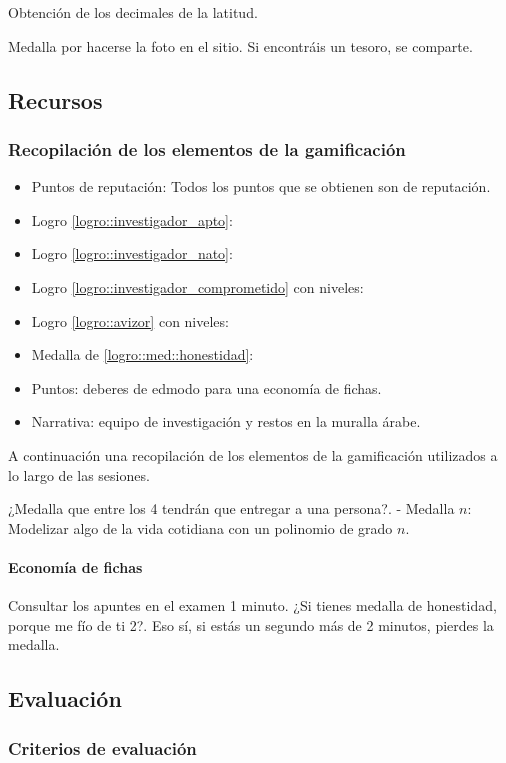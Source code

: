 Obtención de los decimales de la latitud.

Medalla por hacerse la foto en el sitio.
%
Si encontráis un tesoro, se comparte.


\subsection{Recursos}

\subsubsection{Recopilación de los elementos de la gamificación }

\begin{itemize}
	\item Puntos de reputación: Todos los puntos que se obtienen son de reputación.
	\item Logro \ref{logro::investigador_apto}:
	\item Logro \ref{logro::investigador_nato}:
	\item Logro \ref{logro::investigador_comprometido} con niveles:
	\item Logro \ref{logro::avizor} con niveles:
	\item Medalla de \ref{logro::med::honestidad}:
	\item Puntos: deberes de edmodo para una economía de fichas.
	\item Narrativa: equipo de investigación y restos en la muralla árabe.
\end{itemize}


A continuación una recopilación de los elementos de la gamificación utilizados a lo largo de las sesiones.

¿Medalla que entre los 4 tendrán que entregar a una persona?. 
- Medalla $n$: Modelizar algo de la vida cotidiana con un polinomio de grado $n$.

\paragraph{Economía de fichas}
%
Consultar los apuntes en el examen 1 minuto. ¿Si tienes medalla de honestidad, porque me fío de ti 2?. Eso sí, si estás un segundo más de 2 minutos, pierdes la medalla.

\subsection{Evaluación}

\subsubsection{Criterios de evaluación}


